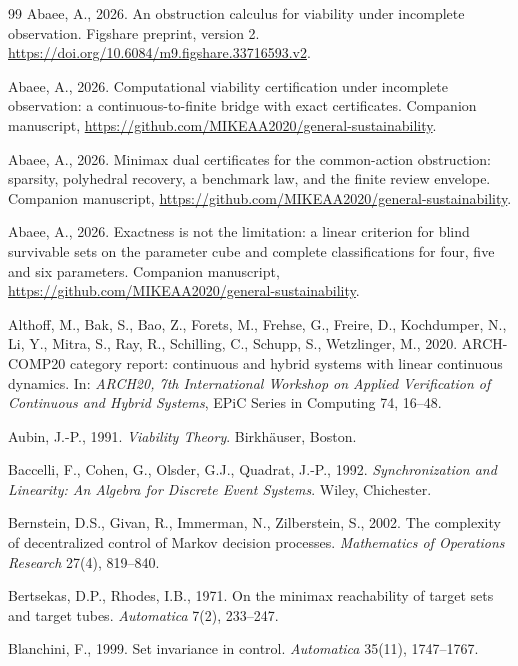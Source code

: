 \documentclass[11pt,a4paper]{article}
\theoremstyle{plain}
\theoremstyle{definition}
\theoremstyle{remark}
\begin{document}
\begin{thebibliography}{99}
\footnotesize
{} Abaee, A., 2026. An obstruction calculus for viability under incomplete observation. Figshare preprint, version 2. \url{https://doi.org/10.6084/m9.figshare.33716593.v2}.

 Abaee, A., 2026. Computational viability certification under incomplete observation: a continuous-to-finite bridge with exact certificates. Companion manuscript, \url{https://github.com/MIKEAA2020/general-sustainability}.

 Abaee, A., 2026. Minimax dual certificates for the common-action obstruction: sparsity, polyhedral recovery, a benchmark law, and the finite review envelope. Companion manuscript, \url{https://github.com/MIKEAA2020/general-sustainability}.

 Abaee, A., 2026. Exactness is not the limitation: a linear criterion for blind survivable sets on the parameter cube and complete classifications for four, five and six parameters. Companion manuscript, \url{https://github.com/MIKEAA2020/general-sustainability}.

 Althoff, M., Bak, S., Bao, Z., Forets, M., Frehse, G., Freire, D., Kochdumper, N., Li, Y., Mitra, S., Ray, R., Schilling, C., Schupp, S., Wetzlinger, M., 2020. ARCH-COMP20 category report: continuous and hybrid systems with linear continuous dynamics. In: \emph{ARCH20, 7th International Workshop on Applied Verification of Continuous and Hybrid Systems}, EPiC Series in Computing 74, 16--48.

 Aubin, J.-P., 1991. \emph{Viability Theory}. Birkh\"auser, Boston.

 Baccelli, F., Cohen, G., Olsder, G.J., Quadrat, J.-P., 1992. \emph{Synchronization and Linearity: An Algebra for Discrete Event Systems}. Wiley, Chichester.

 Bernstein, D.S., Givan, R., Immerman, N., Zilberstein, S., 2002. The complexity of decentralized control of Markov decision processes. \emph{Mathematics of Operations Research} 27(4), 819--840.

 Bertsekas, D.P., Rhodes, I.B., 1971. On the minimax reachability of target sets and target tubes. \emph{Automatica} 7(2), 233--247.

 Blanchini, F., 1999. Set invariance in control. \emph{Automatica} 35(11), 1747--1767.


\end{thebibliography}
\end{document}
